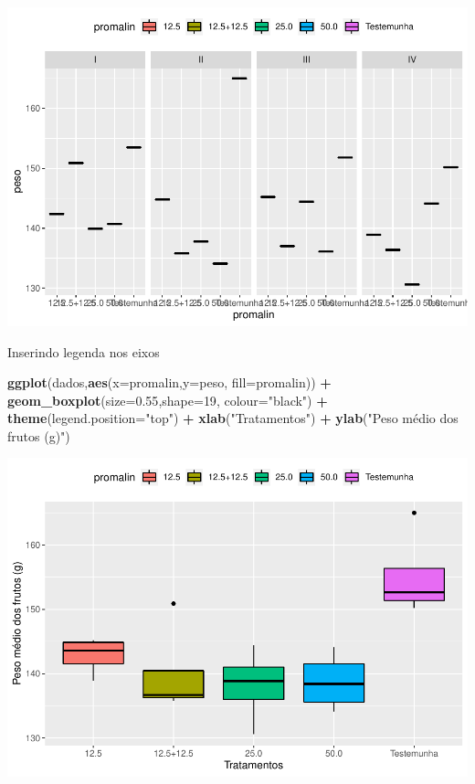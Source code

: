 \documentclass[]{book}
\newenvironment{Shaded}{\begin{snugshade}}{\end{snugshade}}
\newcommand{\DataTypeTok}[1]{\textcolor[rgb]{0.13,0.29,0.53}{#1}}
\newcommand{\DecValTok}[1]{\textcolor[rgb]{0.00,0.00,0.81}{#1}}
\newcommand{\FloatTok}[1]{\textcolor[rgb]{0.00,0.00,0.81}{#1}}
\newcommand{\KeywordTok}[1]{\textcolor[rgb]{0.13,0.29,0.53}{\textbf{#1}}}
\newcommand{\NormalTok}[1]{#1}
\newcommand{\OperatorTok}[1]{\textcolor[rgb]{0.81,0.36,0.00}{\textbf{#1}}}
\newcommand{\StringTok}[1]{\textcolor[rgb]{0.31,0.60,0.02}{#1}}
\begin{document}
\includegraphics{TudodoR_files/figure-latex/unnamed-chunk-234-1.pdf}

Inserindo legenda nos eixos

\begin{Shaded}
\begin{Highlighting}[]
\KeywordTok{ggplot}\NormalTok{(dados,}\KeywordTok{aes}\NormalTok{(}\DataTypeTok{x=}\NormalTok{promalin,}\DataTypeTok{y=}\NormalTok{peso, }\DataTypeTok{fill=}\NormalTok{promalin)) }\OperatorTok{+}\StringTok{ }
\StringTok{       }\KeywordTok{geom_boxplot}\NormalTok{(}\DataTypeTok{size=}\FloatTok{0.55}\NormalTok{,}\DataTypeTok{shape=}\DecValTok{19}\NormalTok{, }\DataTypeTok{colour=}\StringTok{"black"}\NormalTok{) }\OperatorTok{+}\StringTok{ }
\StringTok{       }\KeywordTok{theme}\NormalTok{(}\DataTypeTok{legend.position=}\StringTok{"top"}\NormalTok{) }\OperatorTok{+}\StringTok{ }
\StringTok{       }\KeywordTok{xlab}\NormalTok{(}\StringTok{"Tratamentos"}\NormalTok{) }\OperatorTok{+}\StringTok{  }
\StringTok{       }\KeywordTok{ylab}\NormalTok{(}\StringTok{"Peso médio dos frutos (g)"}\NormalTok{) }
\end{Highlighting}
\end{Shaded}

\includegraphics{TudodoR_files/figure-latex/unnamed-chunk-235-1.pdf}
\end{document}
